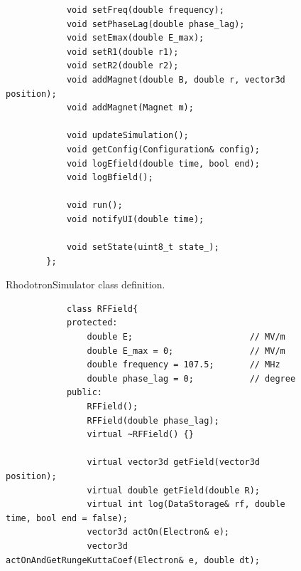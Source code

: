 \documentclass[a4paper,oneside,12pt]{report}
\numberwithin{equation}{chapter}
\begin{document}
{\begin{figure}[H]
\begin{verbatim}
            void setFreq(double frequency);
            void setPhaseLag(double phase_lag);
            void setEmax(double E_max);
            void setR1(double r1);
            void setR2(double r2);
            void addMagnet(double B, double r, vector3d position);
            void addMagnet(Magnet m);
            
            void updateSimulation();
            void getConfig(Configuration& config);
            void logEfield(double time, bool end);
            void logBfield();

            void run();
            void notifyUI(double time);

            void setState(uint8_t state_);
        };
    \end{verbatim}
    \vspace{0pt}
    \caption{RhodotronSimulator class definition.}
    \label{fig:rhodosim_class}
\end{figure}

\begin{figure}[H]
    \begin{minipage}{\textwidth}
        \begin{verbatim}
            class RFField{
            protected:
                double E;                       // MV/m
                double E_max = 0;               // MV/m
                double frequency = 107.5;       // MHz
                double phase_lag = 0;           // degree
            public:
                RFField();
                RFField(double phase_lag);
                virtual ~RFField() {}

                virtual vector3d getField(vector3d position);              
                virtual double getField(double R);
                virtual int log(DataStorage& rf, double time, bool end = false);
                vector3d actOn(Electron& e);    
                vector3d actOnAndGetRungeKuttaCoef(Electron& e, double dt);                  
                

\end{verbatim}
\end{minipage}
\end{figure}}
\end{document}
